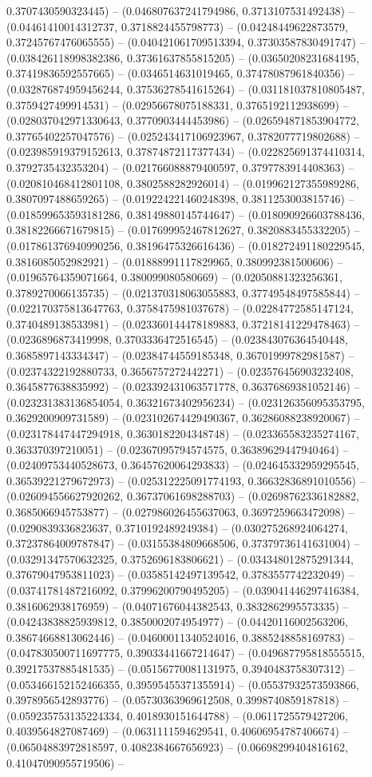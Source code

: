 0.3707430590323445) -- (0.046807637241794986, 0.3713107531492438) -- (0.04461410014312737, 0.3718824455798773) -- (0.04248449622873579, 0.37245767476065555) -- (0.040421061709513394, 0.37303587830491747) -- (0.038426118998382386, 0.37361637855815205) -- (0.03650208231684195, 0.37419836592557665) -- (0.0346514631019465, 0.37478087961840356) -- (0.032876874959456244, 0.37536278541615264) -- (0.031181037810805487, 0.3759427499914531) -- (0.02956678075188331, 0.3765192112938699) -- (0.028037042971330643, 0.3770903444453986) -- (0.026594871853904772, 0.37765402257047576) -- (0.025243417106923967, 0.3782077719802688) -- (0.023985919379152613, 0.37874872117377434) -- (0.022825691374410314, 0.3792735432353204) -- (0.021766088879400597, 0.3797783914408363) -- (0.020810468412801108, 0.3802588282926014) -- (0.019962127355989286, 0.3807097488659265) -- (0.019224221460248398, 0.3811253003815746) -- (0.018599653593181286, 0.38149880145744647) -- (0.018090926603788436, 0.38182266671679815) -- (0.017699952467812627, 0.3820883455332205) -- (0.017861376940990256, 0.38196475326616436) -- (0.018272491180229545, 0.3816085052982921) -- (0.01888991117829965, 0.380992381500606) -- (0.01965764359071664, 0.380099080580669) -- (0.02050881323256361, 0.3789270066135735) -- (0.021370318063055883, 0.37749548497585844) -- (0.022170375813647763, 0.3758475981037678) -- (0.02284772585147124, 0.3740489138533981) -- (0.023360144478189883, 0.37218141229478463) -- (0.0236896873419998, 0.3703336472516545) -- (0.023843076364540448, 0.3685897143334347) -- (0.02384744559185348, 0.36701999782981587) -- (0.02374322192880733, 0.3656757272442271) -- (0.023576456903232408, 0.3645877638835992) -- (0.023392431063571778, 0.36376869381052146) -- (0.023231383136854054, 0.36321673402956234) -- (0.023126356095353795, 0.3629200909731589) -- (0.023102674429490367, 0.36286088238920067) -- (0.023178447447294918, 0.3630182204348748) -- (0.023365583235274167, 0.363370397210051) -- (0.02367095794574575, 0.36389629447940464) -- (0.02409753440528673, 0.36457620064293833) -- (0.024645332959295545, 0.36539221279672973) -- (0.025312225091774193, 0.36632836891010556) -- (0.026094556627920262, 0.36737061698288703) -- (0.02698762336182882, 0.3685066945753877) -- (0.027986026455637063, 0.3697259663472098) -- (0.0290839336823637, 0.3710192489249384) -- (0.030275268924064274, 0.37237864009787847) -- (0.03155384809668506, 0.37379736141631004) -- (0.03291347570632325, 0.3752696183806621) -- (0.034348012875291344, 0.37679047953811023) -- (0.03585142497139542, 0.3783557742232049) -- (0.03741781487216092, 0.37996200790495205) -- (0.039041446297416384, 0.3816062938176959) -- (0.04071676044382543, 0.3832862995573335) -- (0.04243838825939812, 0.3850002074954977) -- (0.04420116002563206, 0.38674668813062446) -- (0.04600011340524016, 0.3885248858169783) -- (0.047830500711697775, 0.39033441667214647) -- (0.049687795818555515, 0.39217537885481535) -- (0.05156770081131975, 0.3940483758307312) -- (0.053466152152466355, 0.39595455371355914) -- (0.05537932573593866, 0.3978956542893776) -- (0.05730363969612508, 0.3998740859187818) -- (0.059235753135224334, 0.4018930151644788) -- (0.0611725579427206, 0.4039564827087469) -- (0.0631111594629541, 0.40606954787406674) -- (0.06504883972818597, 0.4082384667656923) -- (0.06698299404816162, 0.41047090955719506) -- 